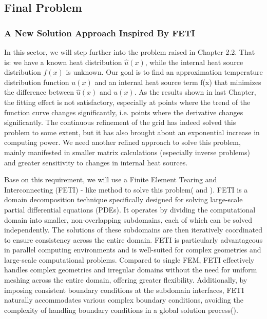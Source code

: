 \documentclass{article}
\begin{document}
    \subsection{Final Problem}
    \subsubsection{A New Solution Approach Inspired By FETI}
    In this sector, we will step further into the problem raised in Chapter 2.2. That is: we have a known heat distribution $\hat{u}(x)$, while the internal heat source distribution $f(x)$ is unknown. Our goal is to find an approximation temperature distribution function \( u(x) \) and an internal heat source term f(x) that minimizes the difference between \( \hat{u}(x) \) and \( u(x) \). As the results shown in last Chapter, the fitting effect is not satisfactory, especially at points where the trend of the function curve changes significantly, i.e. points where the derivative changes significantly. The continuous refinement of the grid has indeed solved this problem to some extent, but it has also brought about an exponential increase in computing power. We need another refined approach to solve this problem, mainly manifested in smaller matrix calculations (especially inverse problems) and greater sensitivity to changes in internal heat sources.
    
    Base on this requirement, we will use a Finite Element Tearing and Interconnecting (FETI) - like method to solve this problem(\textcite{FETI1} and \textcite{FETI2}). FETI is a domain decomposition technique specifically designed for solving large-scale partial differential equations (PDEs). It operates by dividing the computational domain into smaller, non-overlapping subdomains, each of which can be solved independently. The solutions of these subdomains are then iteratively coordinated to ensure consistency across the entire domain. FETI is particularly advantageous in parallel computing environments and is well-suited for complex geometries and large-scale computational problems. Compared to single FEM, FETI effectively handles complex geometries and irregular domains without the need for uniform meshing across the entire domain, offering greater flexibility. Additionally, by imposing consistent boundary conditions at the subdomain interfaces, FETI naturally accommodates various complex boundary conditions, avoiding the complexity of handling boundary conditions in a global solution process(\textcite{more}).
\end{document}
